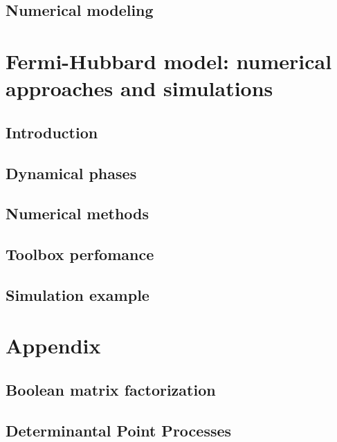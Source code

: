 \documentclass[twoside]{article}
\begin{document}
\subsection{Numerical modeling}


\newpage
\section{Fermi-Hubbard model: numerical approaches and simulations} \label{sec:fhmodel}

\subsection{Introduction}

\subsection{Dynamical phases}

\subsection{Numerical methods}

\subsection{Toolbox perfomance}

\subsection{Simulation example}


\newpage
\section{Appendix} \label{sec:appendix}

\subsection{Boolean matrix factorization}


\subsection{Determinantal Point Processes}
 


\newpage


\end{document}

